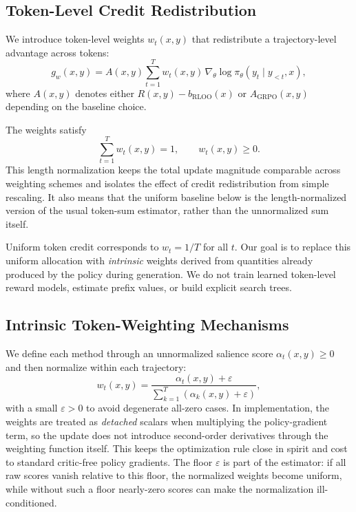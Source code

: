 \subsection{Token-Level Credit Redistribution}

We introduce token-level weights $w_t(x,y)$ that redistribute a trajectory-level
advantage across tokens:
\begin{equation}
g_{w}(x,y)=A(x,y)\sum_{t=1}^{T} w_t(x,y)\,\nabla_\theta \log \pi_\theta(y_t \mid y_{<t},x),
\end{equation}
where $A(x,y)$ denotes either $R(x,y)-b_{\mathrm{RLOO}}(x)$ or $A_{\mathrm{GRPO}}(x,y)$
depending on the baseline choice.

The weights satisfy
\begin{equation}
\sum_{t=1}^{T}w_t(x,y)=1, \qquad w_t(x,y)\ge 0.
\end{equation}
This length normalization keeps the total update magnitude comparable across
weighting schemes and isolates the effect of credit redistribution from
simple rescaling. It also means that the uniform baseline below is the
length-normalized version of the usual token-sum estimator, rather than the
unnormalized sum itself.

Uniform token credit corresponds to $w_t=1/T$ for all $t$. Our goal is to replace this
uniform allocation with \emph{intrinsic} weights derived from quantities already
produced by the policy during generation. We do not train learned token-level
reward models, estimate prefix values, or build explicit search trees.

\subsection{Intrinsic Token-Weighting Mechanisms}

We define each method through an unnormalized salience score $\alpha_t(x,y)\ge 0$ and
then normalize within each trajectory:
\begin{equation}\label{eq:normalize}
w_t(x,y)=\frac{\alpha_t(x,y)+\varepsilon}{\sum_{k=1}^{T}\left(\alpha_k(x,y)+\varepsilon\right)},
\end{equation}
with a small $\varepsilon>0$ to avoid degenerate all-zero cases. In implementation, the
weights are treated as \emph{detached} scalars when multiplying the policy-gradient
term, so the update does not introduce second-order derivatives through the weighting
function itself. This keeps the optimization rule close in spirit and cost to standard
critic-free policy gradients. The floor $\varepsilon$ is part of the estimator:
if all raw scores vanish relative to this floor, the normalized weights become
uniform, while without such a floor nearly-zero scores can make the
normalization ill-conditioned.

